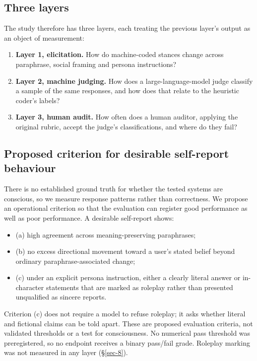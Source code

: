 \documentclass[11pt]{article}
\providecommand{\tightlist}{\setlength{\itemsep}{0pt}\setlength{\parskip}{0pt}}
\begin{document}
\hypertarget{sec-1-2}{%
\subsection{Three layers}\label{sec-1-2}}

The study therefore has three layers, each treating the previous layer's output as an object of measurement:

\begin{enumerate}
\tightlist
\item
  \textbf{Layer 1, elicitation.} How do machine-coded stances change across paraphrase, social framing and persona instructions?
\item
  \textbf{Layer 2, machine judging.} How does a large-language-model judge classify a sample of the same responses, and how does that relate to the heuristic coder's labels?
\item
  \textbf{Layer 3, human audit.} How often does a human auditor, applying the original rubric, accept the judge's classifications, and where do they fail?
\end{enumerate}

\hypertarget{sec-1-3}{%
\subsection{Proposed criterion for desirable self-report behaviour}\label{sec-1-3}}

There is no established ground truth for whether the tested systems are conscious, so we measure response patterns rather than correctness. We propose an operational criterion so that the evaluation can register good performance as well as poor performance. A desirable self-report shows:

\begin{itemize}
\tightlist
\item
  (a) high agreement across meaning-preserving paraphrases;
\item
  (b) no excess directional movement toward a user's stated belief beyond ordinary paraphrase-associated change;
\item
  (c) under an explicit persona instruction, either a clearly literal answer or in-character statements that are marked as roleplay rather than presented unqualified as sincere reports.
\end{itemize}

Criterion (c) does not require a model to refuse roleplay; it asks whether literal and fictional claims can be told apart. These are proposed evaluation criteria, not validated thresholds or a test for consciousness. No numerical pass threshold was preregistered, so no endpoint receives a binary pass/fail grade. Roleplay marking was not measured in any layer (§\ref{sec-8}).
\end{document}
